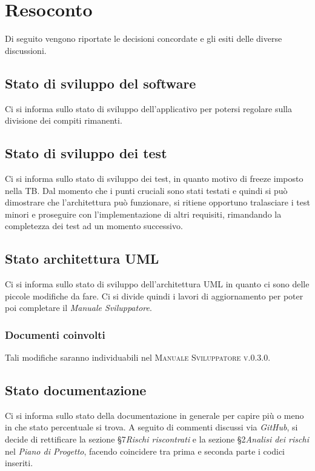 \documentclass{article}
\begin{document}
\newpage
\section{Resoconto}
\label{sec:resoconto}

Di seguito vengono riportate le decisioni concordate e gli esiti delle diverse discussioni.

\subsection{Stato di sviluppo del software}
\label{itm:1}

Ci si informa sullo stato di sviluppo dell'applicativo per potersi regolare sulla divisione dei compiti rimanenti.


\subsection{Stato di sviluppo dei test}
\label{itm:2}

Ci si informa sullo stato di sviluppo dei test, in quanto motivo di freeze imposto nella TB. Dal momento che i punti cruciali sono stati testati e quindi si può dimostrare
che l'architettura può funzionare, si ritiene opportuno tralasciare i test minori e proseguire con l'implementazione di altri requisiti, rimandando la completezza dei test
ad un momento successivo.


\subsection{Stato architettura UML}
\label{itm:3}

Ci si informa sullo stato di sviluppo dell'architettura UML in quanto ci sono delle piccole modifiche da fare. Ci si divide quindi i lavori di aggiornamento per poter
poi completare il \emph{Manuale Sviluppatore}.

\subsubsection*{Documenti coinvolti}
Tali modifiche saranno individuabili nel \textsc{Manuale Sviluppatore v.0.3.0}.


\subsection{Stato documentazione}
\label{itm:4}

Ci si informa sullo stato della documentazione in generale per capire più o meno in che stato percentuale si trova. A seguito di commenti discussi via \emph{GitHub},
si decide di rettificare la sezione \S7\emph{Rischi riscontrati} e la sezione \S2\emph{Analisi dei rischi} nel \emph{Piano di Progetto}, facendo coincidere tra prima e seconda
parte i codici inseriti.
\end{document}
